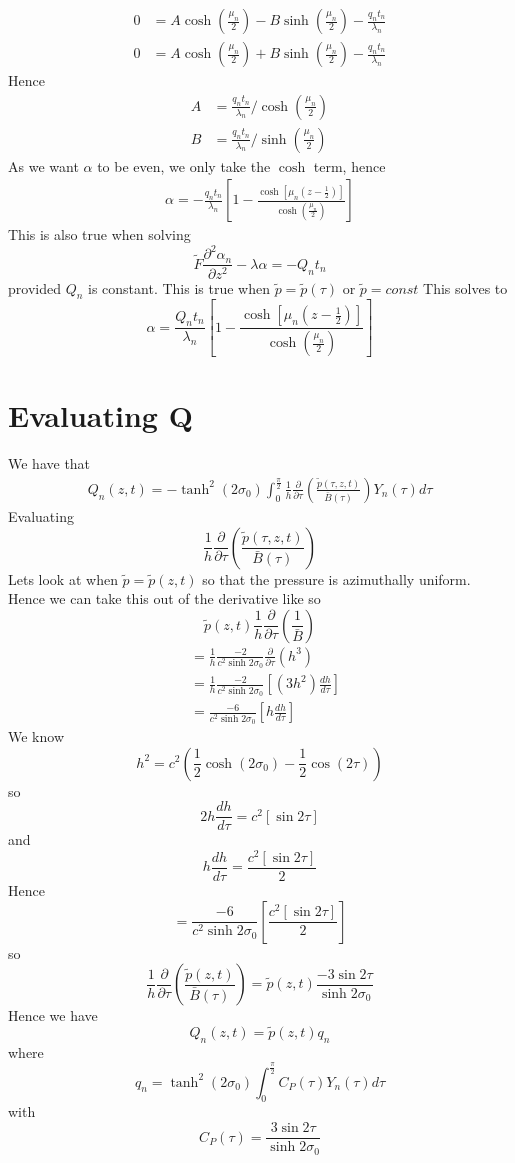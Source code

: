 \documentclass[12pt]{article}
\begin{document}
\begin{align}
0&=A\cosh(\frac{\mu_n}{2})-B\sinh(\frac{\mu_n}{2})-\frac{q_nt_n}{\lambda_n}
\\0&=A\cosh(\frac{\mu_n}{2})+B\sinh(\frac{\mu_n}{2})-\frac{q_nt_n}{\lambda_n}
\end{align}
Hence 
\begin{align}
A&=\frac{q_nt_n}{\lambda_n}/\cosh(\frac{\mu_n}{2})
\\B&=\frac{q_nt_n}{\lambda_n}/\sinh(\frac{\mu_n}{2})
\end{align}
As we want $\alpha$ to be even, we only take the $\cosh$ term, hence 
\begin{align}
\alpha=-\frac{q_nt_n}{\lambda_n}\left[1-\frac{\cosh[\mu_n(z-\frac{1}{2})]}{\cosh(\frac{\mu_n}{2})}\right]
\end{align}
This is also true when solving $$\tilde{F}\frac{\partial^2\alpha_n}{\partial z^2}-\lambda\alpha=-Q_nt_n$$ provided $Q_n$ is constant. This is true when $\tilde{p}=\tilde{p}(\tau)$ or $\tilde{p}=const$
This solves to $$\alpha=\frac{Q_nt_n}{\lambda_n}\left[1-\frac{\cosh[\mu_n(z-\frac{1}{2})]}{\cosh(\frac{\mu_n}{2})}\right]$$





\newpage
\section{Evaluating Q}
We have that 
\begin{align*}
Q_n(z,t)=-\tanh^2(2\sigma_0)\int_0^{\frac{\pi}{2}}\frac{1}{h}\frac{\partial}{\partial \tau}\left(\frac{\tilde{p}(\tau,z,t)}{\bar{B}(\tau)}\right)Y_n(\tau)d\tau
\end{align*}
Evaluating $$\frac{1}{h}\frac{\partial}{\partial \tau}\left( \frac{\tilde{p}(\tau,z,t)}{\bar{B}(\tau)}\right)$$
Lets look at when $\tilde{p}=\tilde{p}(z,t)$ so that the pressure is azimuthally uniform. Hence we can take this out of the derivative like so
$$\tilde{p}(z,t)\frac{1}{h}\frac{\partial}{\partial \tau}\left(\frac{1}{\bar{B}}\right)$$
\begin{align*}
&= \frac{1}{h}\frac{-2}{c^2\sinh 2\sigma_0}\frac{\partial}{\partial \tau}(h^3)
\\ &= \frac{1}{h} \frac{-2}{c^2\sinh 2\sigma_0}\left[(3h^2)\frac{dh}{d\tau}\right]
\\ &= \frac{-6}{c^2\sinh 2\sigma_0}\left[h\frac{dh}{d\tau}\right]
\end{align*}
We know $$h^2=c^2(\frac{1}{2}\cosh(2\sigma_0)-\frac{1}{2}\cos(2\tau))$$ so $$2h\frac{dh}{d\tau}=c^2[\sin 2\tau]$$ and $$h\frac{dh}{d\tau}=\frac{c^2[\sin 2\tau]}{2}$$ Hence $$= \frac{-6}{c^2\sinh 2\sigma_0}\left[\frac{c^2[\sin 2\tau]}{2}\right]$$ so
$$\frac{1}{h}\frac{\partial}{\partial \tau}\left( \frac{\tilde{p}(z,t)}{\bar{B}(\tau)}\right)=\tilde{p}(z,t)\frac{-3\sin 2\tau}{\sinh 2\sigma_0}$$
Hence we have $$Q_n(z,t)=\tilde{p}(z,t)q_n$$ where $$q_n=\tanh^2(2\sigma_0)\int_0^{\frac{\pi}{2}}C_P(\tau)Y_n(\tau)d\tau$$ with $$C_P(\tau)=\frac{3\sin 2\tau}{\sinh 2\sigma_0}$$
\end{document}
